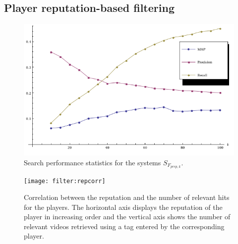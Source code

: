 \subsection{Player reputation-based filtering}
\begin{figure}
\centering
\includegraphics[scale=.5]{filter:rep}
\caption{Search performance statistics for the systems $S_{F_{prep,k}}$.}
\label{filter:fig:reppl}
\end{figure}

\begin{figure}
\centering
\texttt{[image: filter:repcorr]}
\caption{Correlation between the reputation and the number of relevant hits for the players. The horizontal axis displays the reputation of the player in increasing order and the vertical axis shows the number of relevant videos retrieved using a tag entered by the corresponding player.}
\label{filter:fig:repcorr}
\end{figure}

